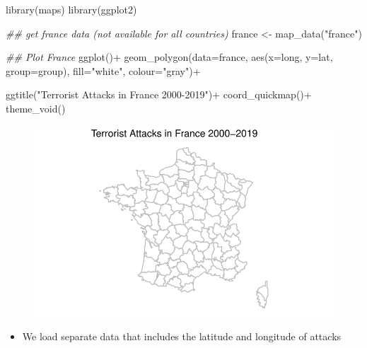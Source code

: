 \documentclass[
  letterpaper,
  DIV=11,
  numbers=noendperiod]{scrreprt}
\newenvironment{Shaded}{\begin{snugshade}}{\end{snugshade}}
\newcommand{\AttributeTok}[1]{\textcolor[rgb]{0.40,0.45,0.13}{#1}}
\newcommand{\DocumentationTok}[1]{\textcolor[rgb]{0.37,0.37,0.37}{\textit{#1}}}
\newcommand{\FunctionTok}[1]{\textcolor[rgb]{0.28,0.35,0.67}{#1}}
\newcommand{\NormalTok}[1]{\textcolor[rgb]{0.00,0.23,0.31}{#1}}
\newcommand{\OtherTok}[1]{\textcolor[rgb]{0.00,0.23,0.31}{#1}}
\newcommand{\SpecialCharTok}[1]{\textcolor[rgb]{0.37,0.37,0.37}{#1}}
\newcommand{\StringTok}[1]{\textcolor[rgb]{0.13,0.47,0.30}{#1}}
\providecommand{\tightlist}{%
  \setlength{\itemsep}{0pt}\setlength{\parskip}{0pt}}\usepackage{longtable,booktabs,array}
\begin{document}
\begin{Shaded}
\begin{Highlighting}[]
\FunctionTok{library}\NormalTok{(maps)}
\FunctionTok{library}\NormalTok{(ggplot2)}

\DocumentationTok{\#\# get france data (not available for all countries)}
\NormalTok{france }\OtherTok{\textless{}{-}} \FunctionTok{map\_data}\NormalTok{(}\StringTok{"france"}\NormalTok{)}

\DocumentationTok{\#\# Plot France}
\FunctionTok{ggplot}\NormalTok{()}\SpecialCharTok{+}
  \FunctionTok{geom\_polygon}\NormalTok{(}\AttributeTok{data=}\NormalTok{france, }\FunctionTok{aes}\NormalTok{(}\AttributeTok{x=}\NormalTok{long, }\AttributeTok{y=}\NormalTok{lat, }\AttributeTok{group=}\NormalTok{group), }\AttributeTok{fill=}\StringTok{"white"}\NormalTok{, }\AttributeTok{colour=}\StringTok{"gray"}\NormalTok{)}\SpecialCharTok{+}
  
  \FunctionTok{ggtitle}\NormalTok{(}\StringTok{"Terrorist Attacks in France 2000{-}2019"}\NormalTok{)}\SpecialCharTok{+}
  \FunctionTok{coord\_quickmap}\NormalTok{()}\SpecialCharTok{+}
  \FunctionTok{theme\_void}\NormalTok{()}
\end{Highlighting}
\end{Shaded}

\begin{figure}[H]

{\centering \includegraphics{12-Maps_files/figure-pdf/unnamed-chunk-21-1.pdf}

}

\end{figure}

\begin{itemize}
\tightlist
\item
  We load separate data that includes the latitude and longitude of
  attacks
\end{itemize}
\end{document}

